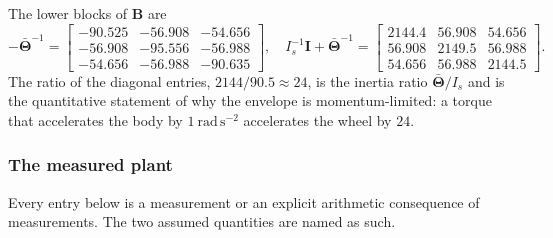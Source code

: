 The lower blocks of $\bm{B}$ are
%
\begin{equation}
  -\bar{\bm{\Theta}}^{-1} = \begin{bmatrix}
    -90.525 & -56.908 & -54.656\\
    -56.908 & -95.556 & -56.988\\
    -54.656 & -56.988 & -90.635
  \end{bmatrix},
  \quad
  I_s^{-1}\bm{I} + \bar{\bm{\Theta}}^{-1} = \begin{bmatrix}
    2144.4 & 56.908 & 54.656\\
    56.908 & 2149.5 & 56.988\\
    54.656 & 56.988 & 2144.5
  \end{bmatrix}.
\end{equation}
%
The ratio of the diagonal entries, $2144/90.5 \approx 24$, is the inertia
ratio $\bar{\bm{\Theta}}/I_s$ and is the quantitative statement of why the
envelope is momentum-limited: a torque that accelerates the body by
$1\ \mathrm{rad\,s^{-2}}$ accelerates the wheel by $24$.

\subsubsection{The measured plant}
\label{sec:measured-plant}

Every entry below is a measurement or an explicit arithmetic consequence of
measurements. The two assumed quantities are named as such.


